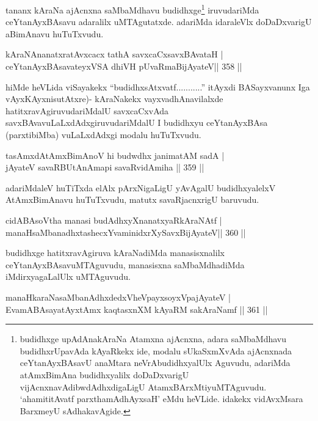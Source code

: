 \begin{artha}
tananx kAraNa ajAcnxna saMbaMdhavu budidhxge\footnote{budidhxge upAdAnakAraNa Atamxna ajAcnxna, adara saMbaMdhavu budidhxrUpavAda kAyaRkekx ide, modalu sUkaSxmXvAda ajAcnxnada ceYtanAyxBAsavU anaMtara neVrAbudidhxyalUlx Aguvudu, adariMda atAmxBimAna budidhxyalilx doDaDxvarigU vijAcnxnavAdibwdAdhxdigaLigU AtamxBArxMtiyuMTAguvudu. `ahamititAvatf parxthamAdhAyxsaH' eMdu heVLide. idakekx vidAvxMsara BarxmeyU sAdhakavAgide.} iruvudariMda ceYtanAyxBAsavu adaralilx uMTAgutatxde. adariMda idaraleVlx doDaDxvarigU aBimAnavu huTuTxvudu.
\end{artha}

\begin{shl}
kAraNAnanatxratAvxcacx tathA savxcaCxsavxBAvataH | \\
ceYtanAyxBAsavateyxVSA dhiVH pUvaRmaBijAyateV\hfill ||  358 ||  
\end{shl}

\begin{artha}
hiMde heVLida viSayakekx ``budidhxsAtxvatf...........'' itAyxdi BASayxvanunx Iga vAyxKAyxnisutAtxre)- kAraNakekx vayxvadhAnavilalxde hatitxravAgiruvudariMdalU savxcaCxvAda savxBAvavuLaLxdAdxgiruvudariMdalU I budidhxyu ceYtanAyxBAsa (parxtibiMba) vuLaLxdAdxgi modalu huTuTxvudu.
\end{artha}

\begin{shl}
tasAmxdAtAmxBimAnoV hi budwdhx janimatAM sadA | \\
jAyateV savaRBUtAnAmapi savaRvidAmiha \hfill||  359 ||  
\end{shl}

\begin{artha}
adariMdaleV huTiTxda elAlx pArxNigaLigU yAvAgalU budidhxyalelxV AtAmxBimAnavu huTuTxvudu, matutx savaRjacnxrigU baruvudu.
\end{artha}

\begin{shl}
cidABAsoV\s tha manasi budAdhxyXnanatxyaRkAraNAtf | \\
manaHsaMbanadhxtashecxYvaminidxrXySavxBijAyateV\hfill ||  360 ||  
\end{shl}

\begin{artha}
budidhxge hatitxravAgiruva kAraNadiMda manasisxnalilx ceYtanAyxBAsavuMTAguvudu, manasisxna saMbaMdhadiMda iMdirxyagaLalUlx uMTAguvudu.
\end{artha}

\begin{shl}
manaHkaraNasaMbanAdhxdedxVheV\s payxsoyxVpajAyateV | \\
EvamABAsayatAyxtAmx kaqtasxnXM kAyaRM sakAraNamf \hfill||  361 ||  
\end{shl}

